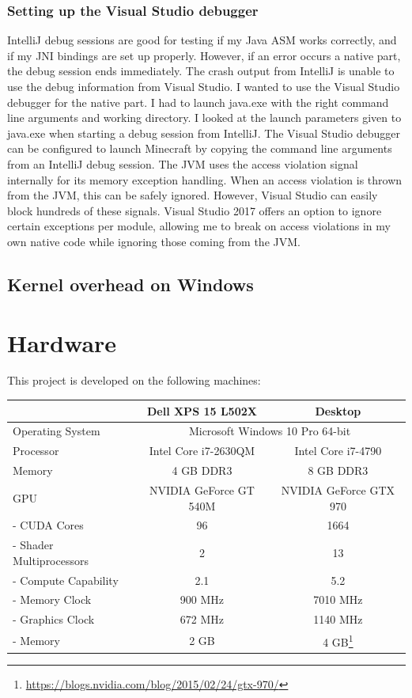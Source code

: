 \documentclass[]{article}
\begin{document}
\subsubsection{Setting up the Visual Studio debugger}
IntelliJ debug sessions are good for testing if my Java ASM works correctly, and if my JNI bindings are set up properly.
However, if an error occurs a native part, the debug session ends immediately.
The crash output from IntelliJ is unable to use the debug information from Visual Studio.
I wanted to use the Visual Studio debugger for the native part.
I had to launch java.exe with the right command line arguments and working directory.
I looked at the launch parameters given to java.exe when starting a debug session from IntelliJ.
The Visual Studio debugger can be configured to launch Minecraft by copying the command line arguments from an IntelliJ debug session.
The JVM uses the access violation signal internally for its memory exception handling.
When an access violation is thrown from the JVM, this can be safely ignored.
However, Visual Studio can easily block hundreds of these signals.
Visual Studio 2017 offers an option to ignore certain exceptions per module, allowing me to break on access violations in my own native code while ignoring those coming from the JVM.

\subsection{Kernel overhead on Windows}

\section{Hardware}
This project is developed on the following machines:

\begin{center}
  \begin{tabular}{| l || c | c |} \hline
    & Dell XPS 15 L502X & Desktop \\ \hline
    Operating System & \multicolumn{2}{c|}{Microsoft Windows 10 Pro 64-bit} \\ \hline
    Processor & Intel Core i7-2630QM & Intel Core i7-4790 \\ \hline
    Memory & 4 GB DDR3 & 8 GB DDR3 \\ \hline \hline
    GPU & NVIDIA GeForce GT 540M & NVIDIA GeForce GTX 970\\ \hline
    - CUDA Cores & 96 & 1664 \\ \hline
    - Shader Multiprocessors & 2 & 13 \\ \hline
    - Compute Capability & 2.1 & 5.2 \\ \hline
    - Memory Clock & 900 MHz & 7010 MHz \\ \hline
    - Graphics Clock & 672 MHz & 1140 MHz \\ \hline
    - Memory & 2 GB & 4 GB\footnote{\url{https://blogs.nvidia.com/blog/2015/02/24/gtx-970/}}\\ \hline
  \end{tabular}
\end{center}
\end{document}
